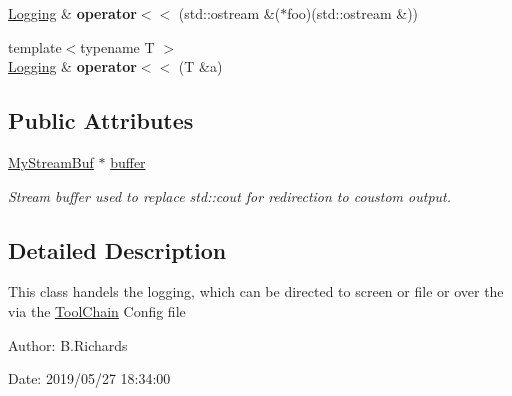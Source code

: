 \begin{DoxyCompactItemize}
\item 
\hypertarget{classLogging_adcbbc7dc2221a2f5fb88dc68089fb91c}{\hyperlink{classLogging}{Logging} \& {\bfseries operator$<$$<$} (std\-::ostream \&($\ast$foo)(std\-::ostream \&))}\label{classLogging_adcbbc7dc2221a2f5fb88dc68089fb91c}

\item 
\hypertarget{classLogging_a4e1557aba6b12232714eead91264587e}{{\footnotesize template$<$typename T $>$ }\\\hyperlink{classLogging}{Logging} \& {\bfseries operator$<$$<$} (T \&a)}\label{classLogging_a4e1557aba6b12232714eead91264587e}

\end{DoxyCompactItemize}
\subsection*{Public Attributes}
\begin{DoxyCompactItemize}
\item 
\hypertarget{classLogging_a0fe24ccb3e56851bb763031243819107}{\hyperlink{classLogging_1_1MyStreamBuf}{My\-Stream\-Buf} $\ast$ \hyperlink{classLogging_a0fe24ccb3e56851bb763031243819107}{buffer}}\label{classLogging_a0fe24ccb3e56851bb763031243819107}

\begin{DoxyCompactList}\small\item\em Stream buffer used to replace std\-::cout for redirection to coustom output. \end{DoxyCompactList}\end{DoxyCompactItemize}


\subsection{Detailed Description}
This class handels the logging, which can be directed to screen or file or over the via the \hyperlink{classToolChain}{Tool\-Chain} Config file

\begin{DoxyParagraph}{Author\-:}
B.\-Richards 
\end{DoxyParagraph}
\begin{DoxyParagraph}{Date\-:}
2019/05/27 18\-:34\-:00 
\end{DoxyParagraph}


